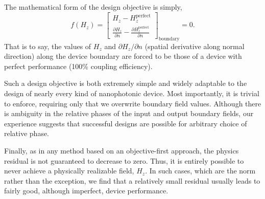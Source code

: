 \documentclass[letterpaper,10pt]{article}
\begin{document}

The mathematical form of the design objective is simply, 
    \begin{equation}
    f(H_z) = \begin{bmatrix}
        H_z - H_z^\text{perfect} \\
        \frac{\partial H_z}{\partial n} - 
            \frac{\partial H_z^\text{perfect}}{\partial n}
        \end{bmatrix}_\text{boundary}
        = 0.
    \end{equation}
That is to say,
    the values of $H_z$ and $\partial H_z / \partial n$
    (spatial derivative along normal direction)
    along the device boundary are forced to be 
    those of a device with perfect performance 
    (100\% coupling efficiency).
     
Such a design objective is both extremely simple and widely adaptable 
    to the design of nearly every kind of nanophotonic device.
Most importantly, it is trivial to enforce,
    requiring only that we overwrite boundary field values.
Although there is ambiguity in the relative phases of 
    the input and output boundary fields,
    our experience suggests that successful designs are possible for 
    arbitrary choice of relative phase.

Finally, as in any method based on an objective-first approach,
    the physics residual is not guaranteed to decrease to zero.
Thus, it is entirely possible to never achieve 
    a physically realizable field, $H_z$.
In such cases, which are the norm rather than the exception,
    we find that a relatively small residual usually leads to
    fairly good, although imperfect, device performance.
    
\end{document}
